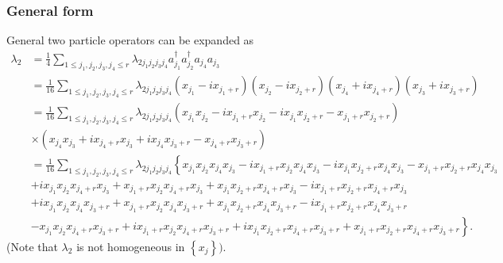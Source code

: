 \documentclass[aps, preprint]{revtex4}
\begin{document}
\subsubsection{General form}
General two particle operators can be expanded as
\begin{align}\lambda _{2} &  =\frac{1}{4} \sum _{1 \leq j_{1} ,j_{2} ,j_{3} ,j_{4} \leq r}\lambda _{2 j_{1} j_{2} j_{3} j_{4}} a_{j_{1}}^{ \dag } a_{j_{2}}^{ \dag } a_{j_{4}} a_{j_{3}} \nonumber  \\
 &  =\frac{1}{16} \sum _{1 \leq j_{1} ,j_{2} ,j_{3} ,j_{4} \leq r}\lambda _{2 j_{1} j_{2} j_{3} j_{4}} \left (x_{j_{1}} -i x_{j_{1} +r}\right ) \left (x_{j_{2}} -i x_{j_{2} +r}\right ) \left (x_{j_{4}} +i x_{j_{4} +r}\right ) \left (x_{j_{3}} +i x_{j_{3} +r}\right ) \nonumber  \\
 &  =\frac{1}{16} \sum _{1 \leq j_{1} ,j_{2} ,j_{3} ,j_{4} \leq r}\lambda _{2 j_{1} j_{2} j_{3} j_{4}} \left (x_{j_{1}} x_{j_{2}} -i x_{j_{1} +r} x_{j_{2}} -i x_{j_{1}} x_{j_{2} +r} -x_{j_{1} +r} x_{j_{2} +r}\right ) \nonumber  \\
 &  \times \left (x_{j_{4}} x_{j_{3}} +i x_{j_{4} +r} x_{j_{3}} +i x_{j_{4}} x_{j_{3} +r} -x_{j_{4} +r} x_{j_{3} +r}\right ) \\
 &  =\frac{1}{16} \sum _{1 \leq j_{1} ,j_{2} ,j_{3} ,j_{4} \leq r}\lambda _{2 j_{1} j_{2} j_{3} j_{4}}\left \{x_{j_{1}} x_{j_{2}} x_{j_{4}} x_{j_{3}} -i x_{j_{1} +r} x_{j_{2}} x_{j_{4}} x_{j_{3}} -i x_{j_{1}} x_{j_{2} +r} x_{j_{4}} x_{j_{3}} -x_{j_{1} +r} x_{j_{2} +r} x_{j_{4}} x_{j_{3}}\right . \nonumber  \\
 &  +i x_{j_{1}} x_{j_{2}} x_{j_{4} +r} x_{j_{3}} +x_{j_{1} +r} x_{j_{2}} x_{j_{4} +r} x_{j_{3}} +x_{j_{1}} x_{j_{2} +r} x_{j_{4} +r} x_{j_{3}} -i x_{j_{1} +r} x_{j_{2} +r} x_{j_{4} +r} x_{j_{3}} \nonumber  \\
 &  +i x_{j_{1}} x_{j_{2}} x_{j_{4}} x_{j_{3} +r} +x_{j_{1} +r} x_{j_{2}} x_{j_{4}} x_{j_{3} +r} +x_{j_{1}} x_{j_{2} +r} x_{j_{4}} x_{j_{3} +r} -i x_{j_{1} +r} x_{j_{2} +r} x_{j_{4}} x_{j_{3} +r} \nonumber  \\
 & \left . -x_{j_{1}} x_{j_{2}} x_{j_{4} +r} x_{j_{3} +r} +i x_{j_{1} +r} x_{j_{2}} x_{j_{4} +r} x_{j_{3} +r} +i x_{j_{1}} x_{j_{2} +r} x_{j_{4} +r} x_{j_{3} +r} +x_{j_{1} +r} x_{j_{2} +r} x_{j_{4} +r} x_{j_{3} +r}\right \}\text{.}\end{align}(Note that $\lambda _{2}$ is not homogeneous in $\left \{x_{j}\right \})\text{.}$ 
\end{document}
